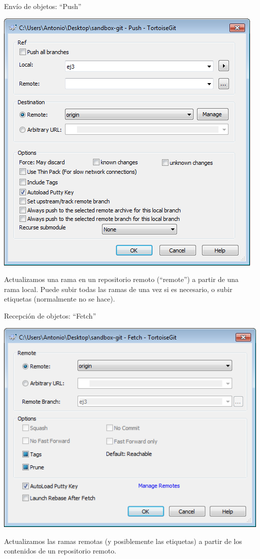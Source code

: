 \documentclass[xcolor=svgnames]{beamer}
\begin{document}
\begin{frame}{Envío de objetos: ``Push''}
  \begin{center}
    \includegraphics[width=\textwidth,height=.65\textheight,keepaspectratio]{tomas/push}
  \end{center}
  
  Actualizamos una rama en un repositorio remoto (``remote'') a partir
  de una rama local. Puede subir todas las ramas de una vez si es
  necesario, o subir etiquetas (normalmente no se hace).
\end{frame}

\begin{frame}{Recepción de objetos: ``Fetch''}
  \begin{center}
    \includegraphics[width=\textwidth,height=.65\textheight,keepaspectratio]{tomas/fetch}
  \end{center}

  Actualizamos las ramas remotas (y posiblemente las etiquetas) a
  partir de los contenidos de un repositorio remoto.
\end{frame}
\end{document}
